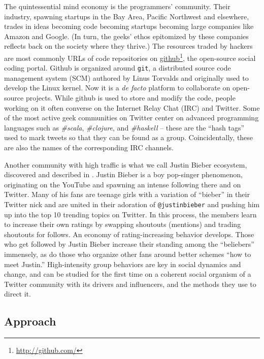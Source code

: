 \documentclass[10pt,oneside]{memoir}
\begin{document}
The quintessential mind economy is the programmers' community. Their industry, spawning startups in the Bay Area, Pacific Northwest and elsewhere, trades in ideas becoming code becoming startups becoming large companies like Amazon and Google. (In turn, the geeks' ethos epitomized by these companies reflects back on the society where they thrive.) The resources traded by hackers are most commonly URLs of code repositories on \href{http://github.com/}{github}\footnote{\href{http://github.com/}{http://github.com/}}, the open-source social coding portal. Github is organized around \texttt{git}, a distributed source code management system (SCM) authored by Linus Torvalds and originally used to develop the Linux kernel. Now it is a {\itshape de facto} platform to collaborate on open-source projects. While github is used to store and modify the code, people working on it often converse on the Internet Relay Chat (IRC) and Twitter. Some of the most active geek communities on Twitter center on advanced programming languages such as {\itshape \#scala}, {\itshape \#clojure}, and {\itshape \#haskell} -- these are the ``hash tags'' used to mark tweets so that they can be found as a group. Coincidentally, these are also the names of the corresponding IRC channels.


Another community with high traffic is what we call Justin Bieber ecosystem, discovered and described in \cite{Khrabrov:2010:Dynamic}. Justin Bieber is a boy pop-singer phenomenon, originating on the YouTube and spawning an intense following there and on Twitter. Many of his fans are teenage girls with a variation of ``bieber'' in their Twitter nick and are united in their adoration of \texttt{@justinbieber} and pushing him up into the top 10 trending topics on Twitter. In this process, the members learn to increase their own ratings by swapping shoutouts (mentions) and trading shoutouts for follows. An economy of rating-increasing behavior develops. Those who get followed by Justin Bieber increase their standing among the ``beliebers'' immensely, as do those who organize other fans around better schemes ``how to meet Justin.'' High-intensity group behaviors are key in social dynamics and change, and can be studied for the first time on a coherent social organism of a Twitter community with its drivers and influencers, and the methods they use to direct it.


\subsection{Approach}
\label{approach}
\end{document}
